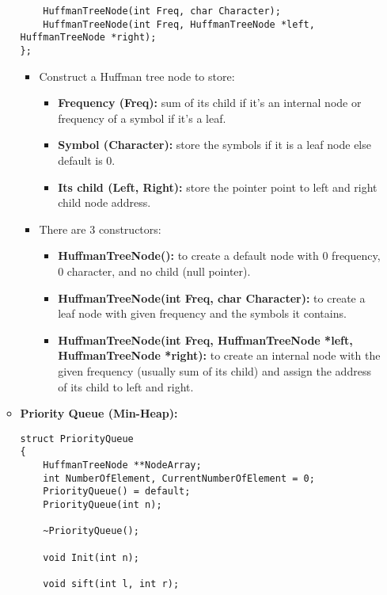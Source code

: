 \begin{enumerate}[label=\textbf{\Alph*.}]
\begin{itemize}
\begin{verbatim}
    HuffmanTreeNode(int Freq, char Character);
    HuffmanTreeNode(int Freq, HuffmanTreeNode *left, HuffmanTreeNode *right);
};
\end{verbatim}
        \begin{itemize}
            \item Construct a Huffman tree node to store:
            \begin{itemize}
                \item \textbf{Frequency (Freq):} sum of its child if it’s an internal node or frequency of a symbol if it’s a leaf.
                \item \textbf{Symbol (Character):} store the symbols if it is a leaf node else default is 0.
                \item \textbf{Its child (Left, Right):} store the pointer point to left and right child node address.
            \end{itemize}
            \item There are 3 constructors:
            \begin{itemize}
                \item \textbf{HuffmanTreeNode():} to create a default node with 0 frequency, 0 character, and no child (null pointer).
                \item \textbf{HuffmanTreeNode(int Freq, char Character):} to create a leaf node with given frequency and the symbols it contains.
                \item \textbf{HuffmanTreeNode(int Freq, HuffmanTreeNode *left, HuffmanTreeNode *right):} to create an internal node with the given frequency (usually sum of its child) and assign the address of its child to left and right.
            \end{itemize}
        \end{itemize}
        \newpage
        \item \textbf{Priority Queue (Min-Heap):}
        \begin{verbatim}
struct PriorityQueue
{
    HuffmanTreeNode **NodeArray;
    int NumberOfElement, CurrentNumberOfElement = 0;
    PriorityQueue() = default;
    PriorityQueue(int n);
    
    ~PriorityQueue();
    
    void Init(int n);
    
    void sift(int l, int r);
    

\end{verbatim}
\end{itemize}
\end{enumerate}
